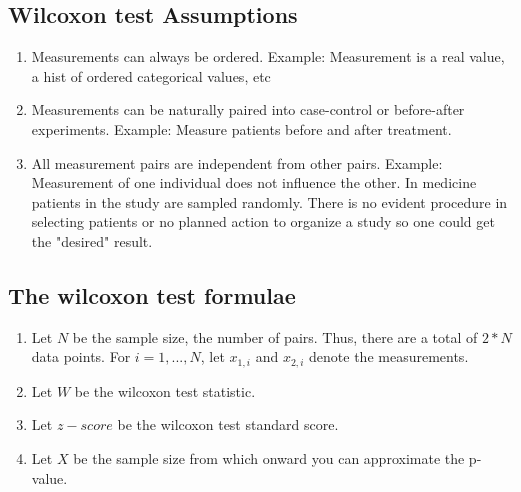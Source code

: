 \documentclass[12pt]{article}
\begin{document}
\newpage

\subsection{Wilcoxon test Assumptions}

\begin{enumerate}
  \item Measurements can always be ordered. Example: Measurement is a real value, a hist of ordered categorical values, etc
  \item Measurements can be naturally paired into case-control or before-after experiments. Example: Measure patients before and after treatment.
  \item All measurement pairs are independent from other pairs. Example: Measurement of one individual does not influence the other. In medicine patients in the study are sampled randomly. There is no evident procedure in selecting patients or no planned action to organize a study so one could get the "desired" result.
\end{enumerate}

\subsection{The wilcoxon test formulae}
\begin{enumerate}
\item Let $N$ be the sample size, the number of pairs. Thus, there are a total of $2*N$ data points. For $i=1,...,N$, let $x_{1, i}$ and $x_{2, i}$ denote the measurements.
\item Let $W$ be the wilcoxon test statistic.
\item Let $z-score$ be the wilcoxon test standard score.
\item Let $X$ be the sample size from which onward you can approximate the p-value.
\end{enumerate}
\end{document}
